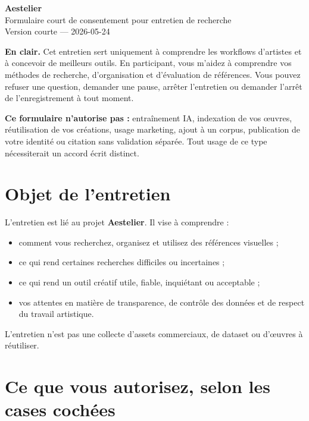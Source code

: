 \documentclass[10pt,a4paper]{article}
\newcommand{\smallnote}[1]{{\small\color{AestelierMuted}#1}}
\newcommand{\notice}[1]{%
  \begingroup
  \setlength{\fboxsep}{0.6em}%
  \noindent\colorbox{AestelierSoft}{%
    \parbox{\dimexpr\linewidth-2\fboxsep\relax}{#1}%
  }%
  \endgroup
  \par\vspace{0.4em}
}
\begin{document}
\begin{center}
  {\Large\textbf{Aestelier}}\\[0.25em]
  {\normalsize Formulaire court de consentement pour entretien de recherche}\\[0.35em]
  \smallnote{Version courte — 2026-05-24}
\end{center}

\vspace{0.4em}

\notice{%
  \textbf{En clair.} Cet entretien sert uniquement à comprendre les workflows d'artistes et à concevoir de meilleurs outils. En participant, vous m'aidez à comprendre vos méthodes de recherche, d'organisation et d'évaluation de références. Vous pouvez refuser une question, demander une pause, arrêter l'entretien ou demander l'arrêt de l'enregistrement à tout moment.\par
  \vspace{0.35em}
  \textbf{Ce formulaire n'autorise pas :} entraînement IA, indexation de vos œuvres, réutilisation de vos créations, usage marketing, ajout à un corpus, publication de votre identité ou citation sans validation séparée. Tout usage de ce type nécessiterait un accord écrit distinct.
}

\section{Objet de l'entretien}

L'entretien est lié au projet \textbf{Aestelier}. Il vise à comprendre :

\begin{itemize}
  \item comment vous recherchez, organisez et utilisez des références visuelles ;
  \item ce qui rend certaines recherches difficiles ou incertaines ;
  \item ce qui rend un outil créatif utile, fiable, inquiétant ou acceptable ;
  \item vos attentes en matière de transparence, de contrôle des données et de respect du travail artistique.
\end{itemize}

L'entretien n'est pas une collecte d'assets commerciaux, de dataset ou d'œuvres à réutiliser.

\section{Ce que vous autorisez, selon les cases cochées}
\end{document}
